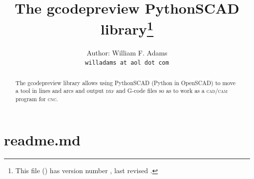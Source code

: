 \documentclass{ltxdoc}
\begin{document}






\title{The gcodepreview PythonSCAD library\thanks{This
        file (\texttt{\jobname}) has version number \fileversion, last revised
        \filedate.}}

\author{%
Author: William F. Adams\\
\texttt{willadams at aol dot com}
}
\date{\filedate}
\maketitle
\begin{abstract}
\noindent The gcodepreview library allows using PythonSCAD (Python in OpenSCAD) to move a tool in lines and arcs and output \textsc{dxf} and G-code files so as to work as a \textsc{cad}/\allowbreak \textsc{cam} program for \textsc{cnc}.
\end{abstract}
\enlargethispage{3\baselineskip}

\setcounter{tocdepth}{2}

\tableofcontents

\clearpage

\setcounter{tocdepth}{5}

\tableofcontents

\clearpage
\section{readme.md}
\end{document}
